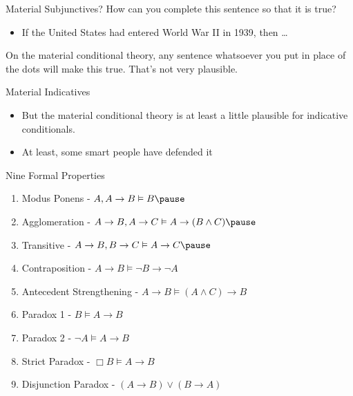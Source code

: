 \documentclass[
  ignorenonframetext,
]{beamer}
\providecommand{\tightlist}{%
  \setlength{\itemsep}{0pt}\setlength{\parskip}{0pt}}
\renewcommand{\,}{\text{, }}
\begin{document}
\begin{frame}{Material Subjunctives?}
\protect\hypertarget{material-subjunctives}{}
How can you complete this sentence so that it is true?

\begin{itemize}
\tightlist
\item
  If the United States had entered World War II in 1939, then \ldots{}
  \pause 
\end{itemize}

On the material conditional theory, any sentence whatsoever you put in
place of the dots will make this true. \pause  That's not very
plausible.
\end{frame}

\begin{frame}{Material Indicatives}
\protect\hypertarget{material-indicatives}{}
\begin{itemize}
\tightlist
\item
  But the material conditional theory is at least a little plausible for
  indicative conditionals.
\item
  At least, some smart people have defended it
\end{itemize}
\end{frame}

\begin{frame}{Nine Formal Properties}
\protect\hypertarget{nine-formal-properties}{}
\begin{enumerate}
\tightlist
\item
  Modus Ponens - \(A, A \rightarrow B \vDash B \pause\)
\item
  Agglomeration -
  \(A \rightarrow B, A \rightarrow C \vDash A \rightarrow (B \wedge C)\pause\)
\item
  Transitive -
  \(A \rightarrow B, B \rightarrow C \vDash A \rightarrow C\pause\)
\item
  Contraposition - \(A \rightarrow B \vDash \neg B \rightarrow \neg A\)
\item
  Antecedent Strengthening -
  \(A \rightarrow B \vDash (A \wedge C) \rightarrow B\)
\item
  Paradox 1 - \(B \vDash A \rightarrow B\)
\item
  Paradox 2 - \(\neg A \vDash A \rightarrow B\)
\item
  Strict Paradox - \(\Box B \vDash A \rightarrow B\)
\item
  Disjunction Paradox - \((A \rightarrow B) \vee (B \rightarrow A)\)
\end{enumerate}
\end{frame}
\end{document}
